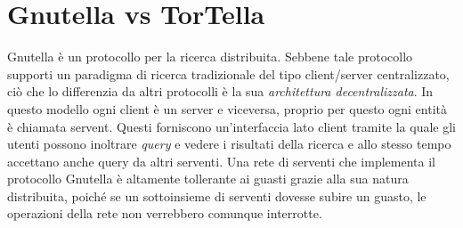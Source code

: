 \chapter{Gnutella vs TorTella}
Gnutella è un protocollo per la ricerca distribuita. Sebbene tale protocollo  supporti un paradigma di ricerca tradizionale del tipo client/server centralizzato, ciò che lo differenzia da altri protocolli è la sua \textit{architettura decentralizzata}. In questo modello ogni client è un server e viceversa, proprio per questo ogni entità è chiamata servent. Questi forniscono un’interfaccia lato client tramite la quale gli utenti possono inoltrare \textit{query} e vedere i risultati della ricerca e allo stesso tempo accettano anche query da altri serventi. Una rete di serventi che implementa il protocollo Gnutella è altamente tollerante ai guasti grazie alla sua natura distribuita, poiché se un sottoinsieme di serventi dovesse subire un guasto, le operazioni della rete non verrebbero comunque interrotte.
